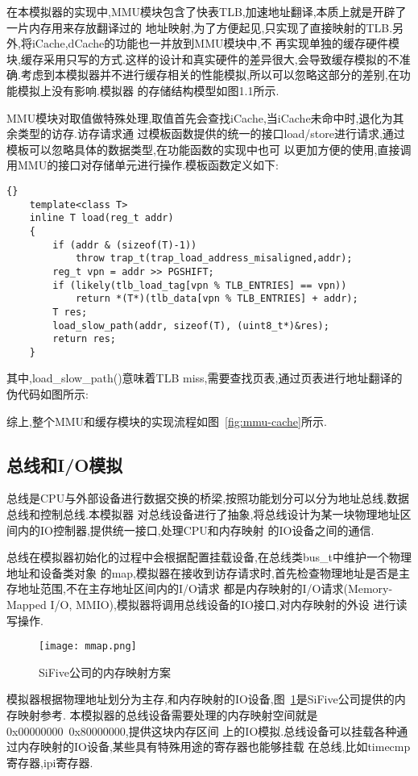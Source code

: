 在本模拟器的实现中,MMU模块包含了快表TLB,加速地址翻译,本质上就是开辟了一片内存用来存放翻译过的
地址映射,为了方便起见,只实现了直接映射的TLB.另外,将iCache,dCache的功能也一并放到MMU模块中,不
再实现单独的缓存硬件模块,缓存采用只写的方式.这样的设计和真实硬件的差异很大,会导致缓存模拟的不准
确.考虑到本模拟器并不进行缓存相关的性能模拟,所以可以忽略这部分的差别,在功能模拟上没有影响.模拟器
的存储结构模型如图1.1所示.


MMU模块对取值做特殊处理,取值首先会查找iCache,当iCache未命中时,退化为其余类型的访存.访存请求通
过模板函数提供的统一的接口load/store进行请求,通过模板可以忽略具体的数据类型,在功能函数的实现中也可
以更加方便的使用,直接调用MMU的接口对存储单元进行操作.模板函数定义如下:
\begin{lstlisting}{}
    template<class T>
    inline T load(reg_t addr)
    {
        if (addr & (sizeof(T)-1))
            throw trap_t(trap_load_address_misaligned,addr);
        reg_t vpn = addr >> PGSHIFT;
        if (likely(tlb_load_tag[vpn % TLB_ENTRIES] == vpn))
            return *(T*)(tlb_data[vpn % TLB_ENTRIES] + addr);
        T res;
        load_slow_path(addr, sizeof(T), (uint8_t*)&res);
        return res;
    }    
\end{lstlisting}


其中,load\_slow\_path()意味着TLB miss,需要查找页表,通过页表进行地址翻译的伪代码如图所示:


综上,整个MMU和缓存模块的实现流程如图~\ref{fig:mmu-cache}所示.


\subsection{总线和I/O模拟}
总线是CPU与外部设备进行数据交换的桥梁,按照功能划分可以分为地址总线,数据总线和控制总线.本模拟器
对总线设备进行了抽象,将总线设计为某一块物理地址区间内的IO控制器,提供统一接口,处理CPU和内存映射
的IO设备之间的通信.


总线在模拟器初始化的过程中会根据配置挂载设备,在总线类bus\_t中维护一个物理地址和设备类对象
的map,模拟器在接收到访存请求时,首先检查物理地址是否是主存地址范围,不在主存地址区间内的I/O请求
都是内存映射的I/O请求(Memory-Mapped I/O, MMIO),模拟器将调用总线设备的IO接口,对内存映射的外设
进行读写操作.
\begin{figure}[h]
    \centering
    \texttt{[image: mmap.png]}
    \caption{SiFive公司的内存映射方案}
    \label{fig:mmap}
\end{figure}

模拟器根据物理地址划分为主存,和内存映射的IO设备,图~\ref{fig:mmap}是SiFive公司提供的内存映射参考.
本模拟器的总线设备需要处理的内存映射空间就是0x00000000~0x80000000,提供这块内存区间
上的IO模拟.总线设备可以挂载各种通过内存映射的IO设备,某些具有特殊用途的寄存器也能够挂载
在总线,比如timecmp寄存器,ipi寄存器.


